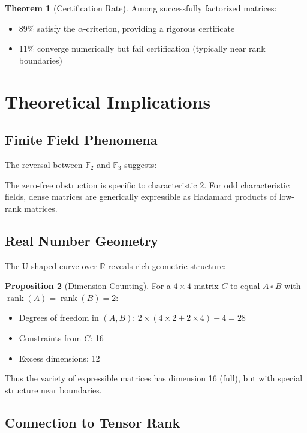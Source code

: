 \documentclass{article}
\theoremstyle{definition}
\newtheorem{theorem}{Theorem}
\newtheorem{proposition}[theorem]{Proposition}
\DeclareMathOperator{\rank}{rank}
\begin{document}
\begin{theorem}[Certification Rate]
Among successfully factorized matrices:
\begin{itemize}
\item 89\% satisfy the $\alpha$-criterion, providing a rigorous certificate
\item 11\% converge numerically but fail certification (typically near rank boundaries)
\end{itemize}
\end{theorem}

\section{Theoretical Implications}

\subsection{Finite Field Phenomena}

The reversal between $\mathbb{F}_2$ and $\mathbb{F}_3$ suggests:

\begin{conjecture}
The zero-free obstruction is specific to characteristic 2. For odd characteristic fields, dense matrices are generically expressible as Hadamard products of low-rank matrices.
\end{conjecture}

\subsection{Real Number Geometry}

The U-shaped curve over $\mathbb{R}$ reveals rich geometric structure:

\begin{proposition}[Dimension Counting]
For a $4 \times 4$ matrix $C$ to equal $A \circ B$ with $\rank(A) = \rank(B) = 2$:
\begin{itemize}
\item Degrees of freedom in $(A,B)$: $2 \times (4 \times 2 + 2 \times 4) - 4 = 28$
\item Constraints from $C$: 16
\item Excess dimensions: 12
\end{itemize}
Thus the variety of expressible matrices has dimension 16 (full), but with special structure near boundaries.
\end{proposition}

\subsection{Connection to Tensor Rank}
\end{document}
